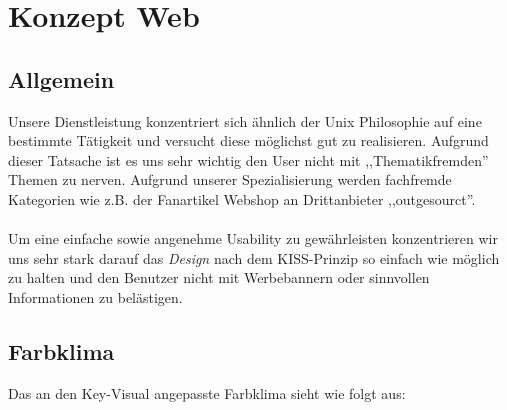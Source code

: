 \chapter{Konzept Web}

\label{konzept_web}
\section{Allgemein}

Unsere Dienstleistung konzentriert sich ähnlich der Unix Philosophie auf eine
bestimmte Tätigkeit und versucht diese möglichst gut zu realisieren. Aufgrund
dieser Tatsache ist es uns sehr wichtig den User nicht mit ,,Thematikfremden''
Themen zu nerven. Aufgrund unserer Spezialisierung werden fachfremde Kategorien
wie z.B. der Fanartikel Webshop an Drittanbieter ,,outgesourct''.
\\
\\
Um eine einfache sowie angenehme Usability zu gewährleisten konzentrieren wir
uns sehr stark darauf das \emph{Design} nach dem KISS-Prinzip so einfach wie
möglich zu halten und den Benutzer nicht mit Werbebannern oder sinnvollen
Informationen zu belästigen.

\newpage

\section{Farbklima}
Das an den Key-Visual angepasste Farbklima sieht wie folgt aus:

